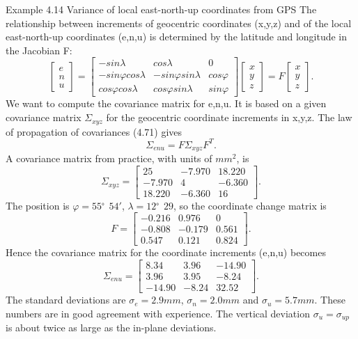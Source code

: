 Example 4.14\; Variance of local east-north-up coordinates from GPS The relationship
between increments of geocentric coordinates (x,y,z) and of the local east-north-up coordinates
(e,n,u) is determined by the latitude and longitude in the Jacobian F:
\begin{equation}
\begin{bmatrix}
e\\ n\\ u
\end{bmatrix}
=
\begin{bmatrix}
-sin\lambda & cos\lambda & 0\\
-sin\varphi cos\lambda & -sin\varphi sin\lambda & cos\varphi \\
cos\varphi cos\lambda & cos\varphi sin\lambda & sin\varphi
\end{bmatrix}
\begin{bmatrix}
x\\y\\z
\end{bmatrix}
=F
\begin{bmatrix}
x\\y\\z
\end{bmatrix}.
\end{equation} 
We want to compute the covariance matrix for e,n,u. It is based on a given covariance
matrix $\Sigma_{xyz}$ for the geocentric coordinate increments in x,y,z. The law of propagation of
covariances (4.71) gives
\begin{equation}
\Sigma_{enu}=F\Sigma_{xyz}F^T.
\end{equation}
A covariance matrix from practice, with units of $mm^2$, is
\begin{equation*}
\Sigma_{xyz}=
\begin{bmatrix}
25 & -7.970 &18.220\\
-7.970 & 4 & -6.360\\
18.220 & -6.360 &16
\end{bmatrix}.
\end{equation*}
The position is $\varphi=55^。54'$, $\lambda=12^。29$, so the coordinate change matrix is
\begin{equation*}
F=
\begin{bmatrix}
-0.216 & 0.976 &0\\
-0.808 & -0.179 & 0.561\\
0.547 &0.121&0.824
\end{bmatrix}.
\end{equation*}
Hence the covariance matrix for the coordinate increments (e,n,u) becomes
\begin{equation*}
\Sigma_{enu}=
\begin{bmatrix}
8.34 & 3.96 &-14.90\\
3.96 & 3.95 &-8.24\\
-14.90 &-8.24 &32.52
\end{bmatrix}.
\end{equation*}
The standard deviations are $\sigma_e=2.9mm$, $\sigma_n=2.0mm$ and $\sigma_u=5.7mm$. These numbers
are in good agreement with experience. The vertical deviation $\sigma_u=\sigma_{up}$ is about twice as large as the in-plane deviations. 
